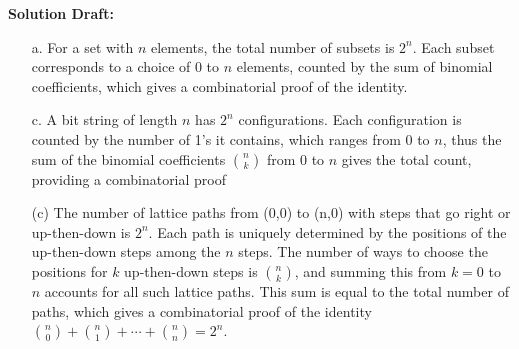 \documentclass{article}
\begin{document}
\vspace{0.5cm}
\noindent\textbf{Solution Draft:} 
\vspace{0.2cm}

\begin{enumerate}
    \item[a.] For a set with \( n \) elements, the total number of subsets is \( 2^n \). Each subset corresponds to a choice of 0 to \( n \) elements, counted by the sum of binomial coefficients, which gives a combinatorial proof of the identity.
    \item[c.] A bit string of length \( n \) has \( 2^n \) configurations. Each configuration is counted by the number of 1's it contains, which ranges from 0 to \( n \), thus the sum of the binomial coefficients \( \binom{n}{k} \) from 0 to \( n \) gives the total count, providing a combinatorial proof
    \item[(c)] The number of lattice paths from (0,0) to (n,0) with steps that go right or up-then-down is \( 2^n \). Each path is uniquely determined by the positions of the up-then-down steps among the \( n \) steps. The number of ways to choose the positions for \( k \) up-then-down steps is \( \binom{n}{k} \), and summing this from \( k = 0 \) to \( n \) accounts for all such lattice paths. This sum is equal to the total number of paths, which gives a combinatorial proof of the identity \( \binom{n}{0} + \binom{n}{1} + \cdots + \binom{n}{n} = 2^n \).
\end{enumerate}
\end{document}
